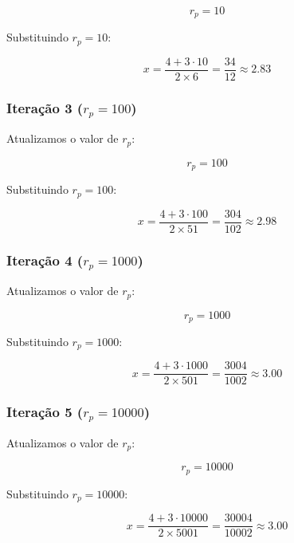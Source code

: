 \documentclass[a4paper, 12pt]{article}
\begin{document}
\begin{equation*}
    r_p = 10
\end{equation*}

Substituindo $r_p = 10$:

\begin{equation*}
    x = \frac{4 + 3 \cdot 10}{2 \times 6} = \frac{34}{12} \approx 2.83
\end{equation*}

\subsubsection{Iteração 3 ($r_p = 100$)}
Atualizamos o valor de $r_p$:

\begin{equation*}
    r_p = 100
\end{equation*}

Substituindo $r_p = 100$:

\begin{equation*}
    x = \frac{4 + 3 \cdot 100}{2 \times 51} = \frac{304}{102} \approx 2.98
\end{equation*}

\subsubsection{Iteração 4 ($r_p = 1000$)}
Atualizamos o valor de $r_p$:

\begin{equation*}
    r_p = 1000
\end{equation*}

Substituindo $r_p = 1000$:

\begin{equation*}
    x = \frac{4 + 3 \cdot 1000}{2 \times 501} = \frac{3004}{1002} \approx 3.00
\end{equation*}

\subsubsection{Iteração 5 ($r_p = 10000$)}
Atualizamos o valor de $r_p$:

\begin{equation*}
    r_p = 10000
\end{equation*}

Substituindo $r_p = 10000$:

\begin{equation*}
    x = \frac{4 + 3 \cdot 10000}{2 \times 5001} = \frac{30004}{10002} \approx 3.00
\end{equation*}
\end{document}
